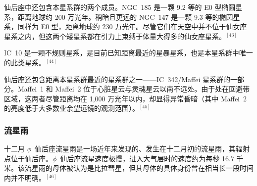 仙后座中还包含本星系群的两个成员。NGC~185 是一颗 9.2 等的 E0 型椭圆星系，距离地球约 200 万光年。稍暗且更远的 NGC~147 是一颗 9.3 等的椭圆星系，同样为 E0 型，距离地球约 230 万光年。尽管它们在天空中并不位于仙女座星系之内，但这两个矮星系都在引力上束缚于体量大得多的仙女座星系。$^{[43]}$

IC~10 是一颗不规则星系，是目前已知距离最近的星暴星系，也是本星系群中唯一的此类星系。$^{[44]}$

仙后座还包含距离本星系群最近的星系群之一——IC~342/Maffei 星系群的一部分。Maffei~1 和 Maffei~2 位于心脏星云与灵魂星云以南不远处。由于处在回避带区域，这两者尽管距离均在 1{,}000 万光年以内，却显得异常昏暗（其中 Maffei~2 的亮度低于大多数业余望远镜的观测范围）。$^{[45]}$
\subsubsection{流星雨}  
十二月 $\phi$~仙后座流星雨是一场近年来发现的、发生在十二月初的流星雨，其辐射点位于仙后座。$\phi$~仙后座流星速度极慢，进入大气层时的速度约为每秒 16.7 千米。该流星雨的母体被认为是比拉彗星，但其母体的具体身份曾在相当长一段时间内并不明确。$^{[46]}$
